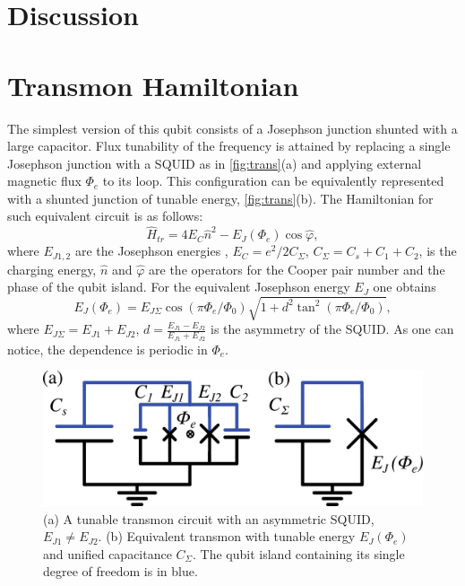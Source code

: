 \documentclass[%
 aip,
 amsmath,amssymb,
 reprint,%
]{revtex4-1}
\begin{document}
\section{Discussion}



\appendix



\section{Transmon Hamiltonian}\label{sec:transmon}

The simplest version of this qubit consists of a Josephson junction shunted with a large capacitor. Flux tunability of the frequency is attained by replacing a single Josephson junction with a SQUID as in \autoref{fig:trans}(a) and applying external magnetic flux $\Phi_e$ to its loop. This configuration can be equivalently represented with a shunted junction of tunable energy, \autoref{fig:trans}(b). The Hamiltonian for such equivalent circuit is as follows: 
\begin{equation}
\hat{H}_{tr} = 4E_C \hat n^2 - E_J(\Phi_e) \cos \hat\varphi,
\label{eq:tr_ham}
\end{equation}
where $E_{J1,2}$ are the Josephson energies , $E_C = e^2/2C_{\Sigma}$, $C_{\Sigma} = C_s + C_1 +C_2$, is the charging energy, $\hat n$ and $\hat \varphi$ are the operators for the Cooper pair number and the phase of the qubit island. For the equivalent Josephson energy $E_{J}$ one obtains
\begin{equation}
E_{J}(\Phi_e) = E_{J\Sigma}\cos\left(\pi \Phi_e/\Phi_0\right) \sqrt{1+d^2 \tan^2 \left(\pi \Phi_e/\Phi_0\right)},
\label{eq:EJ_Phie}
\end{equation}  
where $E_{J\Sigma} = E_{J1}+E_{J2}$, $d = \frac{E_{J1}-E_{J2}}{E_{J1}+E_{J2}}$ is the asymmetry of the SQUID. As one can notice, the dependence is periodic in $\Phi_e$.
\begin{figure}
	\centering
	\includegraphics[width=\linewidth]{transmon}
	\caption{(a) A tunable transmon circuit with an asymmetric SQUID, $E_{J1} \neq E_{J2}$. (b) Equivalent transmon with tunable energy $E_{J}(\Phi_e)$ and unified capacitance $C_{\Sigma}$. The qubit island containing its single degree of freedom is in blue.}
	\label{fig:trans}
\end{figure}
\end{document}
